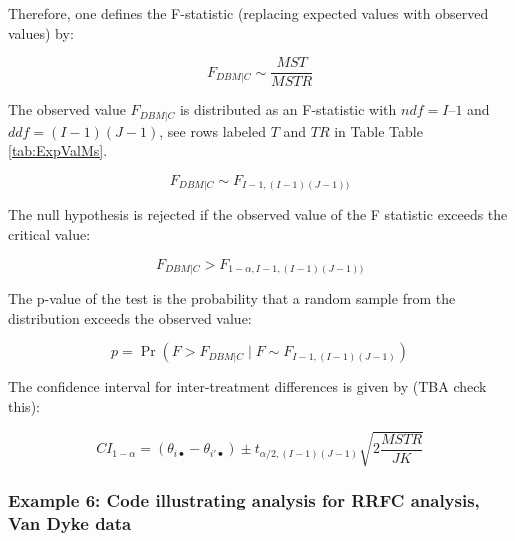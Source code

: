 \documentclass[
]{book}
\begin{document}
Therefore, one defines the F-statistic (replacing expected values with observed values) by:

\begin{equation}
F_{DBM|C} \sim \frac{MST}{MSTR}
\label{eq:FStatRRFC-Misc}
\end{equation}

The observed value \(F_{DBM|C}\) is distributed as an F-statistic with \(ndf = I – 1\) and \(ddf = (I-1)(J-1)\), see rows labeled \(T\) and \(TR\) in Table Table \ref{tab:ExpValMs}.

\begin{equation}
F_{DBM|C} \sim F_{I-1,(I-1)(J-1))}
\label{eq:SamplingFStatRRFC}
\end{equation}

The null hypothesis is rejected if the observed value of the F statistic exceeds the critical value:

\begin{equation}
F_{DBM|C} > F_{1-\alpha,I-1,(I-1)(J-1))}
\label{eq:NhRejectRuleRRFC}
\end{equation}

The p-value of the test is the probability that a random sample from the distribution exceeds the observed value:

\begin{equation}
p=\Pr\left ( F>F_{DBM|C} \mid F \sim F_{I-1,(I-1)(J-1)} \right )
\label{eq:pRRFC}
\end{equation}

The confidence interval for inter-treatment differences is given by (TBA check this):

\begin{equation}
CI_{1-\alpha}=\left ( \theta_{i \bullet} - \theta_{i' \bullet} \right ) \pm t_{\alpha/2,(I-1)(J-1)}\sqrt{2\frac{MSTR}{JK}}
\label{eq:confIntervalRRFC}
\end{equation}

\hypertarget{example-6-code-illustrating-analysis-for-rrfc-analysis-van-dyke-data}{%
\subsubsection{Example 6: Code illustrating analysis for RRFC analysis, Van Dyke data}\label{example-6-code-illustrating-analysis-for-rrfc-analysis-van-dyke-data}}
\end{document}
